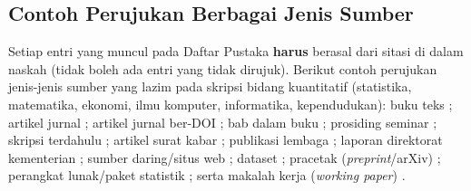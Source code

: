 \subsection{Contoh Perujukan Berbagai Jenis Sumber}
Setiap entri yang muncul pada Daftar Pustaka \textbf{harus} berasal dari sitasi di
dalam naskah (tidak boleh ada entri yang tidak dirujuk). Berikut contoh perujukan
jenis-jenis sumber yang lazim pada skripsi bidang kuantitatif (statistika,
matematika, ekonomi, ilmu komputer, informatika, kependudukan): buku teks
\parencite{cochran1991}; artikel jurnal \parencite{megawati2021,taufiq2021};
artikel jurnal ber-DOI \parencite{etang2022}; bab dalam buku \parencite{satu2023};
prosiding seminar \parencite{santoso2022}; skripsi terdahulu
\parencite{nugraha2024}; artikel surat kabar \parencite{karyadi2009}; publikasi
lembaga \parencite{bps2024}; laporan direktorat kementerian
\parencite{ditjenpdp2023}; sumber daring/situs web \parencite{worldbank2023};
dataset \parencite{bpssusenas2023}; pracetak (\emph{preprint}/arXiv)
\parencite{wang2023}; perangkat lunak/paket statistik \parencite{rcore2024}; serta
makalah kerja (\emph{working paper}) \parencite{ferreira2022}.
